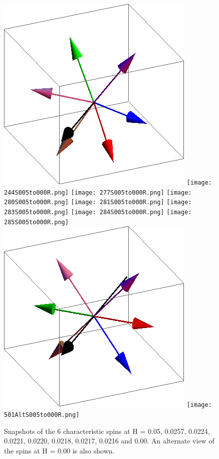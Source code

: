 \documentclass{article}
\begin{document}
\begin{figure}[ht]
\centering
\includegraphics[scale=0.23]{1S005to000R.png}
\texttt{[image: 244S005to000R.png]}
\texttt{[image: 277S005to000R.png]}
\texttt{[image: 280S005to000R.png]}
\texttt{[image: 281S005to000R.png]}
\texttt{[image: 283S005to000R.png]}
\texttt{[image: 284S005to000R.png]}
\texttt{[image: 285S005to000R.png]}
\includegraphics[scale=0.23]{501S005to000R.png}
\texttt{[image: 501AltS005to000R.png]}
\caption{Snapshots of the 6 characteristic spins at H = 0.05, 0.0257, 0.0224, 0.0221, 0.0220, 0.0218, 0.0217, 0.0216
and 0.00. An alternate view of the spins at H = 0.00 is also shown.}
\end{figure}
\end{document}
